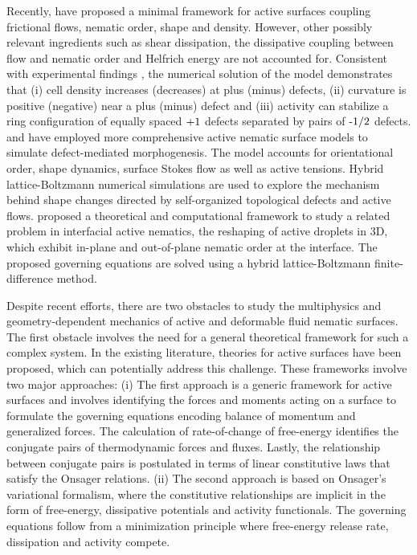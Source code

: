 Recently,  \citet{vafa2021} have proposed a minimal framework for active surfaces coupling frictional flows, nematic order, shape and density. However, other possibly relevant ingredients such as shear dissipation, the dissipative coupling between flow and nematic order and Helfrich energy are not accounted for. Consistent with experimental findings \cite{kawaguchi2017,maroudas2021}, the numerical solution of the model demonstrates that (i)  cell density increases (decreases) at plus (minus) defects, (ii) curvature  is positive (negative) near a plus (minus) defect and (iii) activity can stabilize a ring configuration of equally spaced $\textup{+}1$ defects separated by pairs of $\textup{-}1/2$ defects. \citet{metselaar2019} and \citet{https://doi.org/10.48550/arxiv.2205.06805} have employed more comprehensive active nematic surface models to simulate defect-mediated morphogenesis. The model accounts for orientational order, shape dynamics, surface Stokes flow as well as active tensions. Hybrid lattice-Boltzmann numerical simulations are used to explore the mechanism behind shape changes directed by self-organized topological defects and active flows. \citet{Ruske2021} proposed a theoretical and computational framework to study a related problem in interfacial active nematics, the reshaping of active droplets in 3D, which exhibit in-plane and out-of-plane nematic order at the interface. The proposed governing equations are solved using a hybrid lattice-Boltzmann finite-difference method. %

Despite recent efforts, there are two obstacles to study the multiphysics and geometry-dependent mechanics of active and deformable fluid nematic surfaces. The first obstacle involves the need for a general theoretical framework for such a complex system. In the existing literature,  theories for active surfaces have been proposed, which can potentially address this challenge. These frameworks involve two major approaches: (i) The first approach \cite{salbreux2022} is a generic framework for active surfaces and involves identifying the forces and moments acting on a surface to formulate the  governing equations encoding balance of momentum and generalized forces. The calculation of rate-of-change of free-energy identifies the conjugate pairs of thermodynamic forces and fluxes. Lastly, the relationship between conjugate pairs is postulated in terms of linear constitutive laws that satisfy the Onsager relations. (ii) The second approach \cite{torres2019, arroyo2018} is based on Onsager's variational formalism, where the constitutive relationships are implicit in the form of free-energy, dissipative potentials and activity functionals. The governing equations follow from a minimization principle where free-energy release rate, dissipation and activity compete. 

